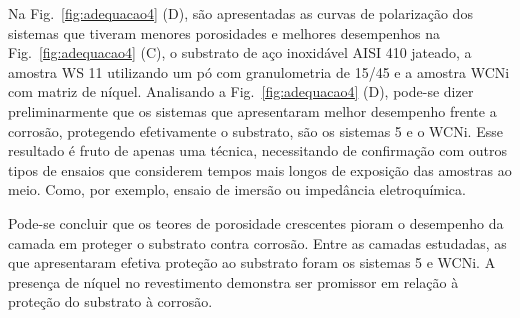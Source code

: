Na Fig.~\ref{fig:adequacao4} (D), são apresentadas as curvas de polarização dos
sistemas que tiveram menores porosidades e melhores desempenhos na
Fig.~\ref{fig:adequacao4} (C), o substrato de aço inoxidável AISI 410 jateado, a
amostra WS 11 utilizando um pó com granulometria de 15/45 e a amostra WCNi com
matriz de níquel. Analisando a Fig.~\ref{fig:adequacao4} (D), pode-se dizer
preliminarmente que os sistemas que apresentaram melhor desempenho frente a
corrosão, protegendo efetivamente o substrato, são os sistemas 5 e o WCNi. Esse
resultado é fruto de apenas uma técnica, necessitando de confirmação com outros
tipos de ensaios que considerem tempos mais longos de exposição das amostras ao
meio. Como, por exemplo, ensaio de imersão ou impedância eletroquímica.

Pode-se concluir que os teores de porosidade crescentes pioram o desempenho da
camada em proteger o substrato contra corrosão. Entre as camadas estudadas, as
que apresentaram efetiva proteção ao substrato foram os sistemas 5 e WCNi. A
presença de níquel no revestimento demonstra ser promissor em relação à proteção
do substrato à corrosão.